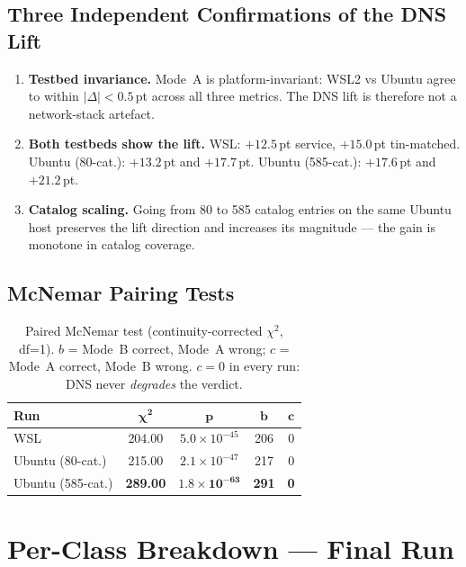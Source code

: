 \documentclass[11pt,a4paper]{article}
\begin{document}
\subsection{Three Independent Confirmations of the DNS Lift}

\begin{enumerate}
\item \textbf{Testbed invariance.} Mode~A is platform-invariant: WSL2
vs Ubuntu agree to within $|\Delta| < 0.5$\,pt across all three
metrics. The DNS lift is therefore not a network-stack artefact.

\item \textbf{Both testbeds show the lift.} WSL: $+12.5$\,pt service,
$+15.0$\,pt tin-matched. Ubuntu (80-cat.): $+13.2$\,pt and $+17.7$\,pt.
Ubuntu (585-cat.): $+17.6$\,pt and $+21.2$\,pt.

\item \textbf{Catalog scaling.} Going from 80 to 585 catalog entries
on the same Ubuntu host preserves the lift direction and increases
its magnitude — the gain is monotone in catalog coverage.
\end{enumerate}

\subsection{McNemar Pairing Tests}

\begin{table}[h]
\centering
\caption{Paired McNemar test (continuity-corrected $\chi^2$, df=1).
$b$ = Mode~B correct, Mode~A wrong; $c$ = Mode~A correct, Mode~B wrong.
$c=0$ in every run: DNS never \emph{degrades} the verdict.}
\begin{tabular}{l|cccc}
\toprule
\textbf{Run} & $\boldsymbol{\chi^2}$ & $\boldsymbol{p}$ & $\boldsymbol{b}$ & $\boldsymbol{c}$ \\
\midrule
WSL                & 204.00 & $5.0\!\times\!10^{-45}$ & 206 & 0 \\
Ubuntu (80-cat.)   & 215.00 & $2.1\!\times\!10^{-47}$ & 217 & 0 \\
\rowcolor{blue!8} Ubuntu (585-cat.) & \textbf{289.00} & $\boldsymbol{1.8\!\times\!10^{-63}}$ & \textbf{291} & \textbf{0} \\
\bottomrule
\end{tabular}
\end{table}

\section{Per-Class Breakdown — Final Run}
\end{document}
